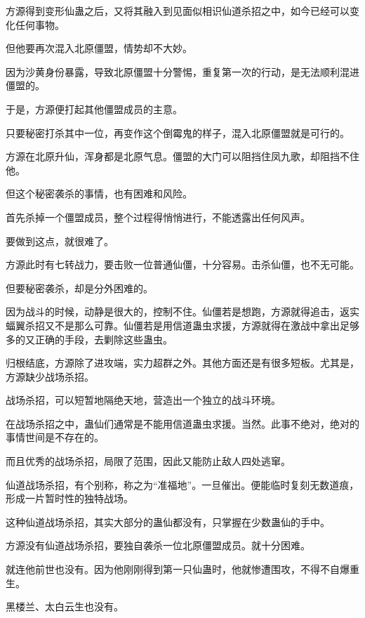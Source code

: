 
\begin{this_body}



方源得到变形仙蛊之后，又将其融入到见面似相识仙道杀招之中，如今已经可以变化任何事物。

但他要再次混入北原僵盟，情势却不大妙。

因为沙黄身份暴露，导致北原僵盟十分警惕，重复第一次的行动，是无法顺利混进僵盟的。

于是，方源便打起其他僵盟成员的主意。

只要秘密打杀其中一位，再变作这个倒霉鬼的样子，混入北原僵盟就是可行的。

方源在北原升仙，浑身都是北原气息。僵盟的大门可以阻挡住凤九歌，却阻挡不住他。

但这个秘密袭杀的事情，也有困难和风险。

首先杀掉一个僵盟成员，整个过程得悄悄进行，不能透露出任何风声。

要做到这点，就很难了。

方源此时有七转战力，要击败一位普通仙僵，十分容易。击杀仙僵，也不无可能。

但要秘密袭杀，却是分外困难的。

因为战斗的时候，动静是很大的，控制不住。仙僵若是想跑，方源就得追击，返实蝠翼杀招又不是那么可靠。仙僵若是用信道蛊虫求援，方源就得在激战中拿出足够多的又正确的手段，去剿除这些蛊虫。

归根结底，方源除了进攻端，实力超群之外。其他方面还是有很多短板。尤其是，方源缺少战场杀招。

战场杀招，可以短暂地隔绝天地，营造出一个独立的战斗环境。

在战场杀招之中，蛊仙们通常是不能用信道蛊虫求援。当然。此事不绝对，绝对的事情世间是不存在的。

而且优秀的战场杀招，局限了范围，因此又能防止敌人四处逃窜。

仙道战场杀招，有个别称，称之为“准福地”。一旦催出。便能临时复刻无数道痕，形成一片暂时性的独特战场。

这种仙道战场杀招，其实大部分的蛊仙都没有，只掌握在少数蛊仙的手中。

方源没有仙道战场杀招，要独自袭杀一位北原僵盟成员。就十分困难。

就连他前世也没有。因为他刚刚得到第一只仙蛊时，他就惨遭围攻，不得不自爆重生。

黑楼兰、太白云生也没有。


\end{this_body}
